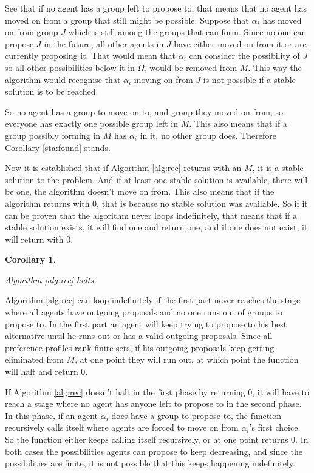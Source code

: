 \documentclass{elsarticle}
\newtheorem{mysta}{Corollary}
\begin{document}
See that if no agent has a group left to propose to, that means that no agent has moved on from a group that still might be possible. Suppose that $\alpha_i$ has moved on from group $J$ which is still among the groups that can form. Since no one can propose $J$ in the future, all other agents in $J$ have either moved on from it or are currently proposing it. That would mean that $\alpha_i$ can consider the possibility of $J$ so all other possibilities below it in $\Omega_i$ would be removed from $M$. This way the algorithm would recognise that $\alpha_i$ moving on from $J$ is not possible if a stable solution is to be reached. 

So no agent has a group to move on to, and group they moved on from, so everyone has exactly one possible group left in $M$. This also means that if a group possibly forming in $M$ has $\alpha_i$ in it, no other group does. Therefore Corollary \ref{sta:found} stands.

Now it is established that if Algorithm \ref{alg:rec} returns with an $M$, it is a stable solution to the problem. And if at least one stable solution is available, there will be one, the algorithm doesn't move on from. This also means that if the algorithm returns with 0, that is because no stable solution was available. So if it can be proven that the algorithm never loops indefinitely, that means that if a stable solution exists, it will find one and return one, and if one does not exist, it will return with 0.

\begin{mysta}
\label{sta:halt}

Algorithm \ref{alg:rec} halts.

\end{mysta}

Algorithm \ref{alg:rec} can loop indefinitely if the first part never reaches the stage where all agents have outgoing proposals and no one runs out of groups to propose to. In the first part an agent will keep trying to propose to his best alternative until he runs out or has a valid outgoing proposals. Since all preference profiles rank finite sets, if his outgoing proposals keep getting eliminated from $M$, at one point they will run out, at which point the function will halt and return 0.

If Algorithm \ref{alg:rec} doesn't halt in the first phase by returning 0, it will have to reach a stage where no agent has anyone left to propose to in the second phase. In this phase, if an agent $\alpha_i$ does have a group to propose to, the function recursively calls itself where agents are forced to move on from $\alpha_i$'s first choice. So the function either keeps calling itself recursively, or at one point returns 0. In both cases the possibilities agents can propose to keep decreasing, and since the possibilities are finite, it is not possible that this keeps happening indefinitely. 
\end{document}
